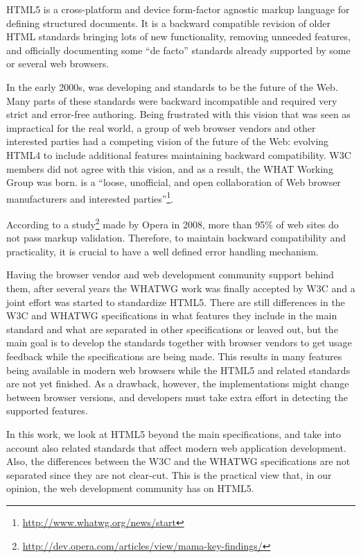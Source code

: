 HTML5 is a cross-platform and device form-factor agnostic markup
language for defining structured documents. It is a backward
compatible revision of older HTML standards bringing lots of new
functionality, removing unneeded features, and officially documenting
some ``de facto'' standards already supported by some or several web
browsers. \cite{pilgrim2010html5}

In the early 2000s,  was developing  and
 standards to be the future of the Web. Many parts of
these standards were backward incompatible and required very strict
and error-free authoring. Being frustrated with this vision that was
seen as impractical for the real world, a group of web browser vendors
and other interested parties had a competing vision of the future of
the Web: evolving HTML4 to include additional features maintaining
backward compatibility. W3C members did not agree with this vision,
and as a result, the WHAT Working Group was born.  is a
``loose, unofficial, and open collaboration of Web browser
manufacturers and interested
parties''\footnote{\url{http://www.whatwg.org/news/start}}. \cite{pilgrim2010html5}

According to a
study\footnote{\url{http://dev.opera.com/articles/view/mama-key-findings/}}
made by Opera in 2008, more than 95\% of web sites do not pass markup
validation. Therefore, to maintain backward compatibility and
practicality, it is crucial to have a well defined error handling
mechanism.

Having the browser vendor and web development community support behind
them, after several years the WHATWG work was finally accepted by W3C
and a joint effort was started to standardize HTML5. There are still
differences in the W3C and WHATWG specifications in what features they
include in the main standard and what are separated in other
specifications or leaved out, but the main goal is to develop the
standards together with browser vendors to get usage feedback while
the specifications are being made. This results in many features being
available in modern web browsers while the HTML5 and related standards
are not yet finished. As a drawback, however, the implementations
might change between browser versions, and developers must take extra
effort in detecting the supported features. \cite{pilgrim2010html5}

In this work, we look at HTML5 beyond the main specifications, and
take into account also related standards that affect modern web
application development. Also, the differences between the W3C and the
WHATWG specifications are not separated since they are not
clear-cut. This is the practical view that, in our opinion, the web
development community has on HTML5.

